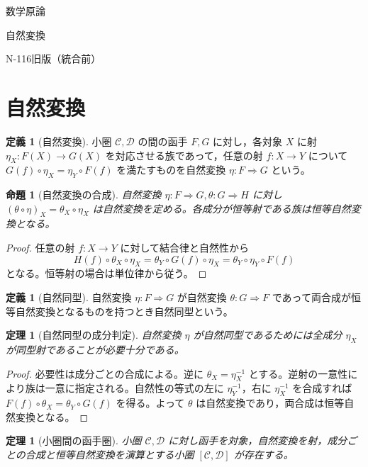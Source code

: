\documentclass[a5paper,10pt,dvipdfmx]{jsarticle}
\theoremstyle{definition}
\newtheorem{defn}[ruledef]{定義}
\theoremstyle{plain}
\newtheorem{prop}[ruledef]{命題}
\newtheorem{thm}[ruledef]{定理}
\begin{document}
\begin{center}
{\small 数学原論}\par\vspace{4mm}
{\LARGE 自然変換}\par\vspace{2mm}
{\small N-116\quad 旧版（統合前）}
\end{center}
\section{自然変換}
\begin{defn}[自然変換]\label{k277}
小圏 $\mathcal C,\mathcal D$ の間の函手 $F,G$ に対し，各対象 $X$ に射 $\eta_X\colon F(X)\to G(X)$ を対応させる族であって，任意の射 $f\colon X\to Y$ について $G(f)\circ\eta_X=\eta_Y\circ F(f)$ を満たすものを自然変換 $\eta\colon F\Rightarrow G$ という。
\end{defn}
\begin{prop}[自然変換の合成]\label{k278}
自然変換 $\eta\colon F\Rightarrow G,\theta\colon G\Rightarrow H$ に対し $(\theta\circ\eta)_X=\theta_X\circ\eta_X$ は自然変換を定める。各成分が恒等射である族は恒等自然変換となる。
\end{prop}
\begin{proof}
任意の射 $f\colon X\to Y$ に対して結合律と自然性から
\[
 H(f)\circ\theta_X\circ\eta_X
 =\theta_Y\circ G(f)\circ\eta_X
 =\theta_Y\circ\eta_Y\circ F(f)
\]
となる。恒等射の場合は単位律から従う。
\end{proof}
\begin{defn}[自然同型]\label{k279}
自然変換 $\eta\colon F\Rightarrow G$ が自然変換 $\theta\colon G\Rightarrow F$ であって両合成が恒等自然変換となるものを持つとき自然同型という。
\end{defn}
\begin{thm}[自然同型の成分判定]\label{k280}
自然変換 $\eta$ が自然同型であるためには全成分 $\eta_X$ が同型射であることが必要十分である。
\end{thm}
\begin{proof}
必要性は成分ごとの合成による。逆に $\theta_X=\eta_X^{-1}$ とする。逆射の一意性により族は一意に指定される。自然性の等式の左に $\eta_Y^{-1}$，右に $\eta_X^{-1}$ を合成すれば $F(f)\circ\theta_X=\theta_Y\circ G(f)$ を得る。よって $\theta$ は自然変換であり，両合成は恒等自然変換となる。
\end{proof}
\begin{thm}[小圏間の函手圏]\label{k281}
小圏 $\mathcal C,\mathcal D$ に対し函手を対象，自然変換を射，成分ごとの合成と恒等自然変換を演算とする小圏 $[\mathcal C,\mathcal D]$ が存在する。
\end{thm}
\end{document}
